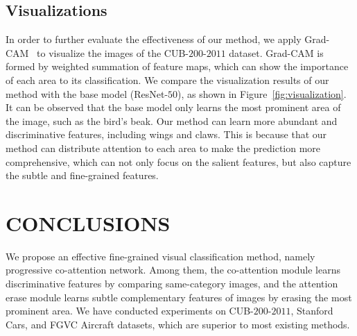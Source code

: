 \documentclass[conference]{IEEEtran}
\begin{document}
\subsection{Visualizations}
In order to further evaluate the effectiveness of our method, we apply Grad-CAM~\cite{Selvaraju_2017_ICCV} to visualize the images of the CUB-$200$-$2011$ dataset. Grad-CAM is formed by weighted summation of feature maps, which can show the importance of each area to its classification. We compare the visualization results of our method with the base model (ResNet-$50$), as shown in Figure~\ref{fig:visualization}. It can be observed that the base model only learns the most prominent area of the image, such as the bird's beak. Our method can learn more abundant and discriminative features, including wings and claws. This is because that our method can distribute attention to each area to make the prediction more comprehensive, which can not only focus on the salient features, but also capture the subtle and fine-grained features.

\section{CONCLUSIONS}
We propose an effective fine-grained visual classification method, namely progressive co-attention network. Among them, the co-attention module learns discriminative features by comparing same-category images, and the attention erase module learns subtle complementary features of images by erasing the most prominent area. We have conducted experiments on CUB-$200$-$2011$, Stanford Cars, and FGVC Aircraft datasets, which are superior to most existing methods. 

\vspace*{0.1in}



\end{document}
